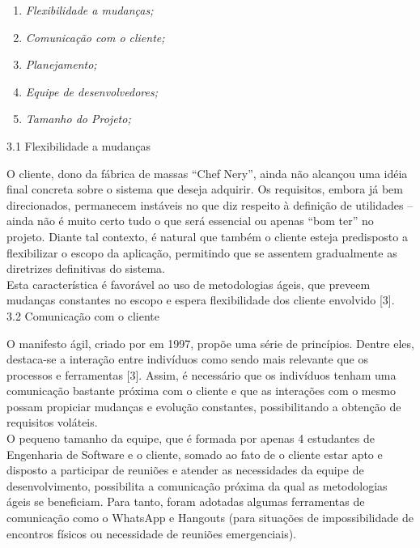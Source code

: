\begin{enumerate}
	\item \textsl{Flexibilidade a mudanças;}
	\item \textsl{Comunicação com o cliente;}
	\item \textsl{Planejamento;}
	\item \textsl{Equipe de desenvolvedores;}
	\item \textsl{Tamanho do Projeto;\\}
\end{enumerate}

{\large{3.1 Flexibilidade a mudanças}\\}


\tab O cliente, dono da fábrica de massas “Chef Nery”, ainda não alcançou uma idéia final concreta sobre o sistema que deseja adquirir. Os requisitos, embora já bem direcionados, permanecem instáveis no que diz respeito à definição de utilidades – ainda não é muito certo tudo o que será essencial ou apenas “bom ter” no projeto. Diante tal contexto, é natural que também o cliente esteja predisposto a flexibilizar o escopo da aplicação, permitindo que se assentem gradualmente as diretrizes definitivas do sistema. \\
\tab Esta característica é favorável ao uso de metodologias ágeis, que preveem mudanças constantes no escopo e espera flexibilidade dos cliente envolvido [3]. \\



{\large{3.2 Comunicação com o cliente\\}}

\tab O manifesto ágil, criado por  em 1997, propõe uma série de princípios. Dentre eles, destaca-se a interação entre indivíduos como sendo mais relevante que os processos e ferramentas  [3]. Assim,  é necessário que os indivíduos tenham uma comunicação bastante próxima  com o cliente e que as interações com o mesmo possam propiciar mudanças e evolução constantes, possibilitando  a obtenção de requisitos voláteis. \\
\tab O pequeno tamanho da equipe, que é formada por apenas 4 estudantes de Engenharia de Software e o cliente, somado ao fato de o cliente estar apto e disposto a participar de reuniões e atender as necessidades da equipe de desenvolvimento, possibilita a comunicação próxima da qual as metodologias ágeis se beneficiam. Para tanto, foram adotadas algumas ferramentas de comunicação como o WhatsApp e Hangouts (para situações de impossibilidade de encontros físicos ou necessidade de reuniões emergenciais). \\


